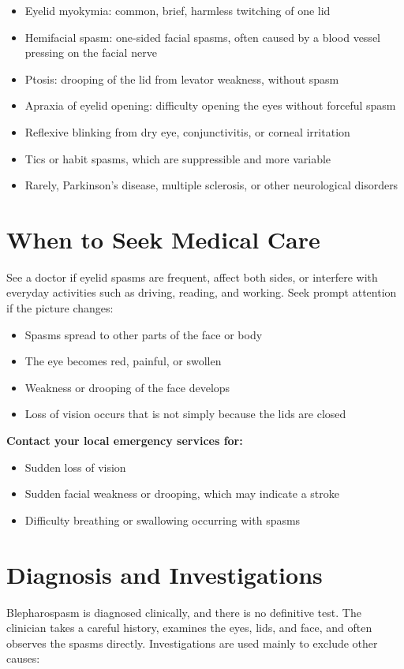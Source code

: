 \begin{itemize}
    \item Eyelid myokymia: common, brief, harmless twitching of one lid
    \item Hemifacial spasm: one-sided facial spasms, often caused by a blood vessel pressing on the facial nerve
    \item Ptosis: drooping of the lid from levator weakness, without spasm
    \item Apraxia of eyelid opening: difficulty opening the eyes without forceful spasm
    \item Reflexive blinking from dry eye, conjunctivitis, or corneal irritation
    \item Tics or habit spasms, which are suppressible and more variable
    \item Rarely, Parkinson's disease, multiple sclerosis, or other neurological disorders
\end{itemize}

\section*{When to Seek Medical Care}
See a doctor if eyelid spasms are frequent, affect both sides, or interfere with everyday activities such as driving, reading, and working. Seek prompt attention if the picture changes:

\begin{itemize}
    \item Spasms spread to other parts of the face or body
    \item The eye becomes red, painful, or swollen
    \item Weakness or drooping of the face develops
    \item Loss of vision occurs that is not simply because the lids are closed
\end{itemize}

\textbf{Contact your local emergency services for:}
\begin{itemize}
    \item Sudden loss of vision
    \item Sudden facial weakness or drooping, which may indicate a stroke
    \item Difficulty breathing or swallowing occurring with spasms
\end{itemize}

\section*{Diagnosis and Investigations}
Blepharospasm is diagnosed clinically, and there is no definitive test. The clinician takes a careful history, examines the eyes, lids, and face, and often observes the spasms directly. Investigations are used mainly to exclude other causes:

